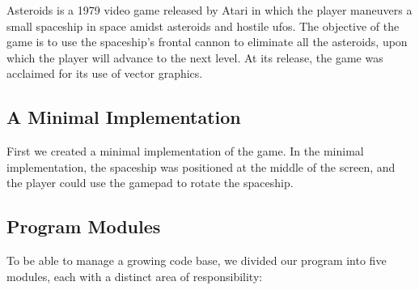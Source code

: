 Asteroids is a 1979 video game released by Atari in which the player maneuvers a small spaceship in space amidst asteroids and hostile ufos. The objective of the game is to use the spaceship's frontal cannon to eliminate all the asteroids, upon which the player will advance to the next level. At its release, the game was acclaimed for its use of vector graphics.


\subsection{A Minimal Implementation}
First we created a minimal implementation of the game. In the minimal implementation, the spaceship was positioned at the middle of the screen, and the player could use the gamepad to rotate the spaceship. 


\subsection{Program Modules}
To be able to manage a growing code base, we divided our program into five modules, each with a distinct area of responsibility:

